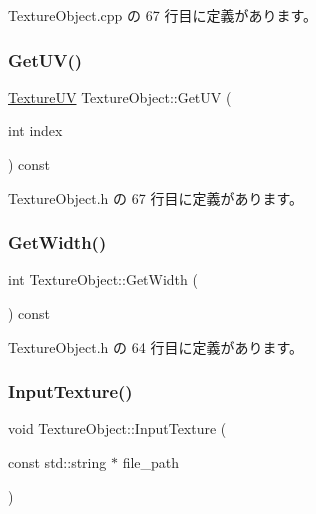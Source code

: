  Texture\+Object.\+cpp の 67 行目に定義があります。

\mbox{\label{class_texture_object_a51b8a2723302c2d38624a62f9205c4bb}} 
\subsubsection{\texorpdfstring{Get\+U\+V()}{GetUV()}}
{\footnotesize\ttfamily \mbox{\hyperlink{struct_texture_object_1_1_texture_u_v}{Texture\+UV}} Texture\+Object\+::\+Get\+UV (\begin{DoxyParamCaption}\item[{int}]{index }\end{DoxyParamCaption}) const\hspace{0.3cm}{\ttfamily [inline]}}



 Texture\+Object.\+h の 67 行目に定義があります。

\mbox{\label{class_texture_object_a72c079770e7e4355b6481d28a0a472ac}} 
\subsubsection{\texorpdfstring{Get\+Width()}{GetWidth()}}
{\footnotesize\ttfamily int Texture\+Object\+::\+Get\+Width (\begin{DoxyParamCaption}{ }\end{DoxyParamCaption}) const\hspace{0.3cm}{\ttfamily [inline]}}



 Texture\+Object.\+h の 64 行目に定義があります。

\mbox{\label{class_texture_object_a93196fc80c026672b8a15cec21ef5dea}} 
\subsubsection{\texorpdfstring{Input\+Texture()}{InputTexture()}}
{\footnotesize\ttfamily void Texture\+Object\+::\+Input\+Texture (\begin{DoxyParamCaption}\item[{const std\+::string $\ast$}]{file\+\_\+path }\end{DoxyParamCaption})\hspace{0.3cm}{\ttfamily [private]}}



